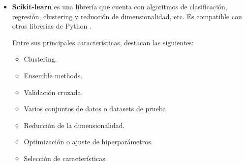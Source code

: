\begin{itemize}
	
	
	Además, mencionan que permite crear y personalizar los gráficos más comunes, entre los que se encuentran:
	
	
	
	\begin{itemize}
		
		\item Diagramas de barras.
		
		\item Histograma.
		
		\item Diagramas de sectores.
		
		\item Diagramas de caja y bigotes.
		
	\end{itemize}
	
	
	
	\item \textbf{Scikit-learn} es una librería que cuenta con algoritmos de clasificación, regresión, clustering y reducción de dimensionalidad, etc. Es compatible con otras librerías de Python \cite{mds_scikitlearn}.
	
	
	
	Entre sus principales características, \cite{itop_scikitlearn} destacan las siguientes:
	
	
	
	\begin{itemize}
		
		\item Clustering.
		
		\item Ensemble methods.
		
		\item Validación cruzada.
		
		\item Varios conjuntos de datos o datasets de prueba.
		
		\item Reducción de la dimensionalidad.
		
		\item Optimización o ajuste de hiperparámetros.
		
		\item Selección de características.
		
	\end{itemize}
	
	
	
\end{itemize}

